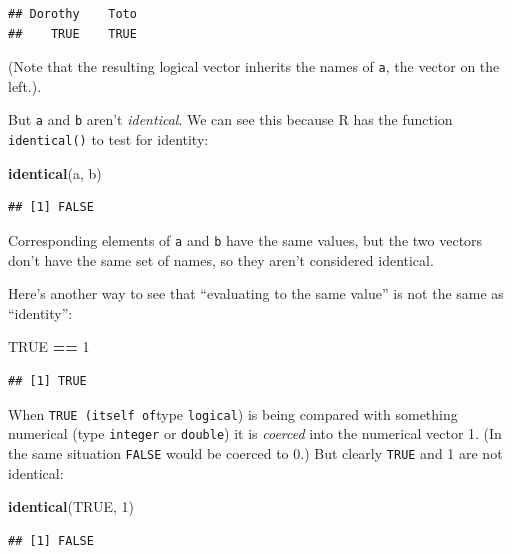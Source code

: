 \documentclass[]{book}
\makeatletter
\newenvironment{Shaded}{\begin{snugshade}}{\end{snugshade}}
\newcommand{\KeywordTok}[1]{\textcolor[rgb]{0.13,0.29,0.53}{\textbf{#1}}}
\newcommand{\DecValTok}[1]{\textcolor[rgb]{0.00,0.00,0.81}{#1}}
\newcommand{\StringTok}[1]{\textcolor[rgb]{0.31,0.60,0.02}{#1}}
\newcommand{\OtherTok}[1]{\textcolor[rgb]{0.56,0.35,0.01}{#1}}
\newcommand{\OperatorTok}[1]{\textcolor[rgb]{0.81,0.36,0.00}{\textbf{#1}}}
\newcommand{\NormalTok}[1]{#1}
\newenvironment{kframe}{%
\medskip{}
\setlength{\fboxsep}{.8em}
 \def\at@end@of@kframe{}%
 \ifinner\ifhmode%
  \def\at@end@of@kframe{\end{minipage}}%
  \begin{minipage}{\columnwidth}%
 \fi\fi%
 \def\FrameCommand##1{\hskip\@totalleftmargin \hskip-\fboxsep
 \colorbox{shadecolor}{##1}\hskip-\fboxsep
     \hskip-\linewidth \hskip-\@totalleftmargin \hskip\columnwidth}%
 \MakeFramed {\advance\hsize-\width
   \@totalleftmargin\z@ \linewidth\hsize
   \@setminipage}}%
 {\par\unskip\endMakeFramed%
 \at@end@of@kframe}
\renewenvironment{Shaded}{\begin{kframe}}{\end{kframe}}
\theoremstyle{definition}
\theoremstyle{definition}
\theoremstyle{definition}
\theoremstyle{remark}
\makeatother
\begin{document}
\begin{verbatim}
## Dorothy    Toto 
##    TRUE    TRUE
\end{verbatim}

(Note that the resulting logical vector inherits the names of
\texttt{a}, the vector on the left.).

But \texttt{a} and \texttt{b} aren't \emph{identical}. We can see this
because R has the function \texttt{identical()} to test for identity:

\begin{Shaded}
\begin{Highlighting}[]
\KeywordTok{identical}\NormalTok{(a, b)}
\end{Highlighting}
\end{Shaded}

\begin{verbatim}
## [1] FALSE
\end{verbatim}

Corresponding elements of \texttt{a} and \texttt{b} have the same
values, but the two vectors don't have the same set of names, so they
aren't considered identical.

Here's another way to see that ``evaluating to the same value'' is not
the same as ``identity'':

\begin{Shaded}
\begin{Highlighting}[]
\OtherTok{TRUE} \OperatorTok{==}\StringTok{ }\DecValTok{1}
\end{Highlighting}
\end{Shaded}

\begin{verbatim}
## [1] TRUE
\end{verbatim}

When \texttt{TRUE\ (itself\ of}type \texttt{logical}) is being compared
with something numerical (type \texttt{integer} or \texttt{double}) it
is \emph{coerced} into the numerical vector 1. (In the same situation
\texttt{FALSE} would be coerced to 0.) But clearly \texttt{TRUE} and 1
are not identical:

\begin{Shaded}
\begin{Highlighting}[]
\KeywordTok{identical}\NormalTok{(}\OtherTok{TRUE}\NormalTok{, }\DecValTok{1}\NormalTok{)}
\end{Highlighting}
\end{Shaded}

\begin{verbatim}
## [1] FALSE
\end{verbatim}
\end{document}
